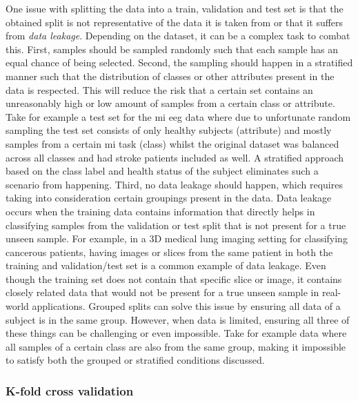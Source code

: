 One issue with splitting the data into a train, validation and test set is that the obtained split is not representative of the data it is taken from or that it suffers from \textit{data leakage}.
Depending on the dataset, it can be a complex task to combat this.
First, samples should be sampled randomly such that each sample has an equal chance of being selected.
Second, the sampling should happen in a stratified manner such that the distribution of classes or other attributes present in the data is respected.
This will reduce the risk that a certain set contains an unreasonably high or low amount of samples from a certain class or attribute.
Take for example a test set for the \gls{mi} \gls{eeg} data where due to unfortunate random sampling the test set consists of only healthy subjects (attribute) and mostly samples from a certain \gls{mi} task (class) whilst the original dataset was balanced across all classes and had stroke patients included as well.
A stratified approach based on the class label and health status of the subject eliminates such a scenario from happening.
Third, no data leakage should happen, which requires taking into consideration certain groupings present in the data.
Data leakage occurs when the training data contains information that directly helps in classifying samples from the validation or test split that is not present for a true unseen sample.
For example, in a 3D medical lung imaging setting for classifying cancerous patients, having images or slices from the same patient in both the training and validation/test set is a common example of data leakage.
Even though the training set does not contain that specific slice or image, it contains closely related data that would not be present for a true unseen sample in real-world applications.
Grouped splits can solve this issue by ensuring all data of a subject is in the same group.
However, when data is limited, ensuring all three of these things can be challenging or even impossible.
Take for example data where all samples of a certain class are also from the same group, making it impossible to satisfy both the grouped or stratified conditions discussed.



\subsubsection{K-fold cross validation}
\label{subsubsec:processing_signals_evaluating_and_using_evaluation_kfold}


